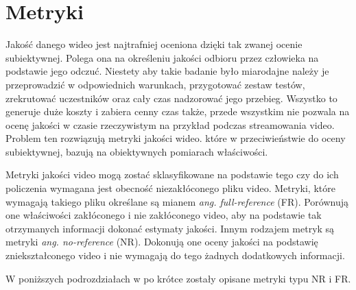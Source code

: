 \section{Metryki}

Jakość danego wideo jest najtrafniej oceniona dzięki tak zwanej ocenie subiektywnej. Polega ona na określeniu jakości odbioru przez człowieka na podstawie jego odczuć. Niestety aby takie badanie było miarodajne należy je przeprowadzić w odpowiednich warunkach, przygotować zestaw testów, zrekrutować uczestników oraz cały czas nadzorować jego przebieg. Wszystko to generuje duże koszty i zabiera cenny czas także, przede wszystkim nie pozwala na ocenę jakości w czasie rzeczywistym na przykład podczas streamowania video. Problem ten rozwiązują metryki jakości wideo. które w przeciwieństwie do oceny subiektywnej, bazują na obiektywnych pomiarach właściwości\cite{vqm}.\par
Metryki jakości video mogą zostać sklasyfikowane na podstawie tego czy do ich policzenia wymagana jest obecność niezakłóconego pliku video. Metryki, które wymagają takiego pliku określane są mianem {\em ang. full-reference} (FR). Porównują one właściwości zakłóconego i nie zakłóconego video, aby na podstawie tak otrzymanych informacji dokonać estymaty jakości. Innym rodzajem metryk są metryki {\em ang. no-reference} (NR). Dokonują one oceny jakości na podstawię zniekształconego video i nie wymagają do tego żadnych dodatkowych informacji\cite{vqm}.\par

W poniższych podrozdziałach w po krótce zostały opisane metryki typu NR i FR.

